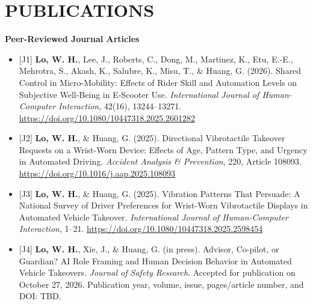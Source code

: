 \documentclass[11pt]{article}
\begin{document}
\vspace{0.5em}

\section*{PUBLICATIONS}


\textbf{Peer-Reviewed Journal Articles}

\begin{itemize}[leftmargin=*, topsep=0pt, itemsep=6pt]

  \item \begin{samepage}{[J1]} \textbf{Lo, W. H.}, Lee, J., Roberts, C., Dong, M., Martinez, K., Etu, E.-E., Mehrotra, S., Akash, K., Salubre, K., Misu, T., \& Huang, G. (2026). Shared Control in Micro-Mobility: Effects of Rider Skill and Automation Levels on Subjective Well-Being in E-Scooter Use. \textit{International Journal of Human-Computer Interaction}, 42(16), 13244--13271. \href{https://doi.org/10.1080/10447318.2025.2601282}{\url{https://doi.org/10.1080/10447318.2025.2601282}}
  \par\end{samepage}

  \item \begin{samepage}{[J2]} \textbf{Lo, W. H.}, \& Huang, G. (2025). Directional Vibrotactile Takeover Requests on a Wrist-Worn Device: Effects of Age, Pattern Type, and Urgency in Automated Driving. \textit{Accident Analysis \& Prevention}, 220, Article 108093. \href{https://doi.org/10.1016/j.aap.2025.108093}{\url{https://doi.org/10.1016/j.aap.2025.108093}}
  \par\end{samepage}

  \item \begin{samepage}{[J3]} \textbf{Lo, W. H.}, \& Huang, G. (2025). Vibration Patterns That Persuade: A National Survey of Driver Preferences for Wrist-Worn Vibrotactile Displays in Automated Vehicle Takeover. \textit{International Journal of Human-Computer Interaction}, 1--21. \href{https://doi.org/10.1080/10447318.2025.2598454}{\url{https://doi.org/10.1080/10447318.2025.2598454}}
  \par\end{samepage}

  \item \begin{samepage}{[J4]} \textbf{Lo, W. H.}, Xie, J., \& Huang, G. (in press). Advisor, Co-pilot, or Guardian? AI Role Framing and Human Decision Behavior in Automated Vehicle Takeovers. \textit{Journal of Safety Research}. Accepted for publication on October 27, 2026. Publication year, volume, issue, pages/article number, and DOI: TBD.
  \par\end{samepage}

\end{itemize}
\end{document}
